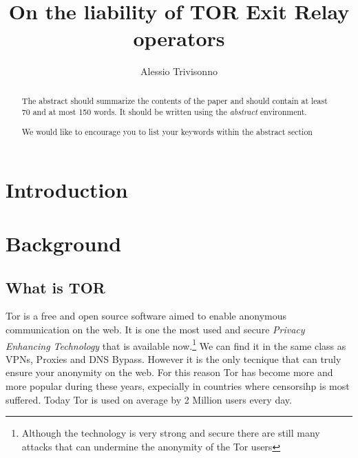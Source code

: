 \documentclass[runningheads,a4paper]{llncs}
\newcommand{\keywords}[1]{\par\addvspace\baselineskip
\noindent\keywordname\enspace\ignorespaces#1}
\begin{document}
\mainmatter  %

\title{On the liability of TOR Exit Relay operators}

\titlerunning{}

%
%
\author{Alessio Trivisonno}
%
\authorrunning{}


%
%

\toctitle{}
\tocauthor{}
\maketitle


\begin{abstract}
The abstract should summarize the contents of the paper and should
contain at least 70 and at most 150 words. It should be written using the
\emph{abstract} environment.
\keywords{We would like to encourage you to list your keywords within
the abstract section}
\end{abstract}


\section{Introduction}

\section{Background}

\subsection{What is TOR}

Tor is a free and open source software aimed to enable 
anonymous communication on the web. It is one the most used and secure \textit{Privacy Enhancing Technology} that is available now.\footnote{Although the technology is very strong and secure there are still many attacks that can undermine the anonymity of the Tor users} We can find it in the same class as VPNs, Proxies and 
DNS Bypass. However it is the only tecnique that can truly ensure your anonymity on the web. For this reason Tor has become more and more popular during these years, expecially in countries where censorsihp is most suffered. Today Tor is used on average by 2 Million users every day.
\end{document}
